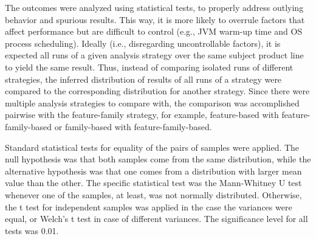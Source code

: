 The outcomes were analyzed using statistical tests, to properly address outlying
behavior and spurious results.  This way, it is more likely to overrule factors
that affect performance but are difficult to control (e.g., JVM warm-up time and
OS process scheduling).  Ideally (i.e., disregarding uncontrollable factors), it
is expected all runs of a given analysis strategy over the same subject product
line to yield the same result. Thus, instead of comparing isolated runs of
different strategies, the inferred distribution of results of all runs of a
strategy were compared to the corresponding distribution for another strategy.
Since there were multiple analysis strategies to compare with, the comparison
was accomplished pairwise with the feature-family strategy, for example,
feature-based with feature-family-based or family-based with
feature-family-based.

Standard statistical tests for equality of the pairs of samples were applied.
The null hypothesis was that both samples come from the same distribution, while
the alternative hypothesis was that one comes from a distribution with larger
mean value than the other. The specific statistical test was the Mann-Whitney U
test whenever one of the samples, at least, was not normally distributed.
Otherwise, the t test for independent samples was applied in the case the
variances were equal, or Welch's t test in case of different variances.  The
significance level for all tests was 0.01.












